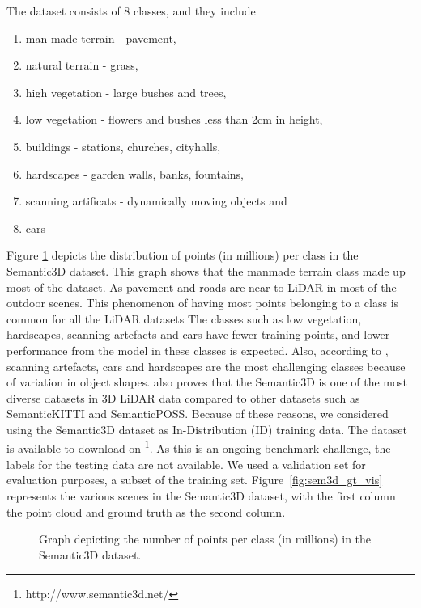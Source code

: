     The dataset consists of 8 classes, and they include
\begin{enumerate}
    \item man-made terrain - pavement,
    \item natural terrain - grass,
    \item high vegetation - large bushes and trees,
    \item low vegetation - flowers and bushes less than 2cm in height,
    \item buildings - stations, churches, cityhalls,
    \item hardscapes - garden walls, banks, fountains,
    \item scanning artificats - dynamically moving objects and
    \item cars
\end{enumerate}
Figure \ref{fig:sem3ddist} depicts the distribution of points (in millions) per class in the Semantic3D dataset.
This graph shows that the manmade terrain class made up most of the dataset.
As pavement and roads are near to LiDAR in most of the outdoor scenes.
This phenomenon of having most points belonging to a class is common for all the LiDAR datasets 
The classes such as low vegetation, hardscapes, scanning artefacts and cars have fewer training points, and lower performance from the model in these classes is expected.
Also, according to \cite{hackel2017semantic3d}, scanning artefacts, cars and hardscapes are the most challenging classes because of variation in object shapes.
\cite{survey3d} also proves that the Semantic3D is one of the most diverse datasets in 3D LiDAR data compared to other datasets such as SemanticKITTI and SemanticPOSS.
Because of these reasons, we considered using the Semantic3D dataset as In-Distribution (ID) training data.
The dataset is available to download on \footnote[1]{http://www.semantic3d.net/}. 
As this is an ongoing benchmark challenge, the labels for the testing data are not available.
We used a validation set for evaluation purposes, a subset of the training set.
Figure~\ref{fig:sem3d_gt_vis} represents the various scenes in the Semantic3D dataset, with the first column the point cloud and ground truth as the second column.
\begin{figure}[h!]
    \centering
    
    \caption{Graph depicting the number of points per class (in millions) in the Semantic3D dataset.}
    \label{fig:sem3ddist}
\end{figure}


